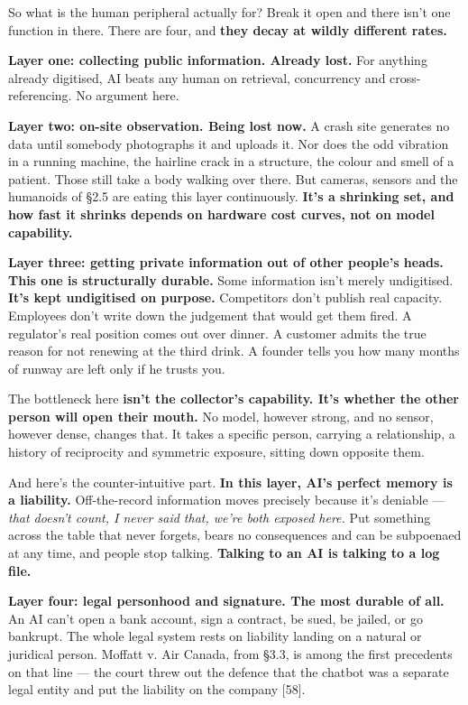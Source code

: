 \documentclass[11pt,a4paper]{article}
\begin{document}
So what is the human peripheral actually for? Break it open and there isn't one function in there. There are four, and \textbf{they decay at wildly different rates.}

\textbf{Layer one: collecting public information. Already lost.} For anything already digitised, AI beats any human on retrieval, concurrency and cross-referencing. No argument here.

\textbf{Layer two: on-site observation. Being lost now.} A crash site generates no data until somebody photographs it and uploads it. Nor does the odd vibration in a running machine, the hairline crack in a structure, the colour and smell of a patient. Those still take a body walking over there. But cameras, sensors and the humanoids of \S{}2.5 are eating this layer continuously. \textbf{It's a shrinking set, and how fast it shrinks depends on hardware cost curves, not on model capability.}

\textbf{Layer three: getting private information out of other people's heads. This one is structurally durable.} Some information isn't merely undigitised. \textbf{It's kept undigitised on purpose.} Competitors don't publish real capacity. Employees don't write down the judgement that would get them fired. A regulator's real position comes out over dinner. A customer admits the true reason for not renewing at the third drink. A founder tells you how many months of runway are left only if he trusts you.

The bottleneck here \textbf{isn't the collector's capability. It's whether the other person will open their mouth.} No model, however strong, and no sensor, however dense, changes that. It takes a specific person, carrying a relationship, a history of reciprocity and symmetric exposure, sitting down opposite them.

And here's the counter-intuitive part. \textbf{In this layer, AI's perfect memory is a liability.} Off-the-record information moves precisely because it's deniable --- \textit{that doesn't count, I never said that, we're both exposed here.} Put something across the table that never forgets, bears no consequences and can be subpoenaed at any time, and people stop talking. \textbf{Talking to an AI is talking to a log file.}

\textbf{Layer four: legal personhood and signature. The most durable of all.} An AI can't open a bank account, sign a contract, be sued, be jailed, or go bankrupt. The whole legal system rests on liability landing on a natural or juridical person. Moffatt v. Air Canada, from \S{}3.3, is among the first precedents on that line --- the court threw out the defence that the chatbot was a separate legal entity and put the liability on the company [58].
\end{document}
